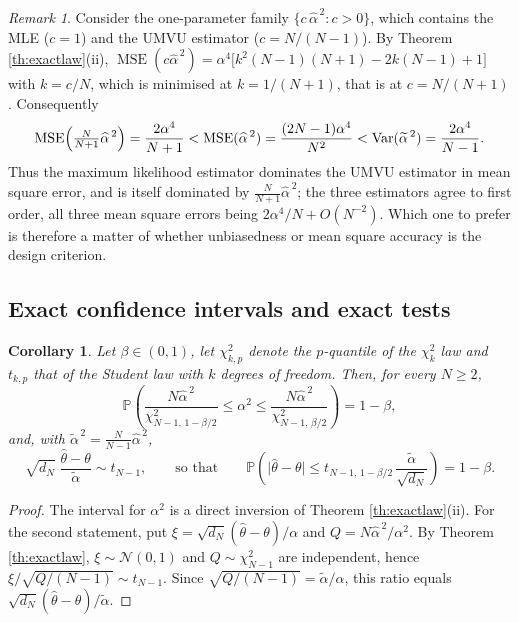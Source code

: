 \documentclass[11pt,reqno]{amsart}
\numberwithin{equation}{section}
\theoremstyle{plain}
\newtheorem{corollary}[theorem]{Corollary}
\theoremstyle{definition}
\theoremstyle{remark}
\newtheorem{remark}[theorem]{Remark}
\newcommand{\Prob}{\mathbb{P}}
\newcommand{\Norm}{\mathcal{N}}
\DeclareMathOperator{\Var}{Var}
\DeclareMathOperator{\MSE}{MSE}
\begin{document}
\begin{remark}\label{re:msecomp}
Consider the one-parameter family $\{c\,\widehat\alpha^{\,2}:c>0\}$, which contains the
MLE ($c=1$) and the UMVU estimator ($c=N/(N-1)$). By Theorem \ref{th:exactlaw}(ii),
$\MSE(c\widehat\alpha^{\,2})
=\alpha^{4}\bigl[k^{2}(N-1)(N+1)-2k(N-1)+1\bigr]$ with $k=c/N$, which is minimised at
$k=1/(N+1)$, that is at $c=N/(N+1)$. Consequently
\begin{equation}\label{eq:msecomp}
  \MSE\Bigl(\tfrac{N}{N+1}\widehat\alpha^{\,2}\Bigr)=\frac{2\alpha^{4}}{N+1}
  <\MSE(\widehat\alpha^{\,2})=\frac{(2N-1)\alpha^{4}}{N^{2}}
  <\Var(\widetilde\alpha^{\,2})=\frac{2\alpha^{4}}{N-1}.
\end{equation}
Thus the maximum likelihood estimator dominates the UMVU estimator in mean square error,
and is itself dominated by $\frac{N}{N+1}\widehat\alpha^{\,2}$; the three estimators
agree to first order, all three mean square errors being $2\alpha^{4}/N+O(N^{-2})$. Which
one to prefer is therefore a matter of whether unbiasedness or mean square accuracy is
the design criterion.
\end{remark}

\subsection{Exact confidence intervals and exact tests}

\begin{corollary}\label{co:ci}
Let $\beta\in(0,1)$, let $\chi^{2}_{k,p}$ denote the $p$-quantile of the $\chi^{2}_{k}$
law and $t_{k,p}$ that of the Student law with $k$ degrees of freedom. Then, for every
$N\ge2$,
\begin{equation}\label{eq:ci-alpha}
  \Prob\left(\frac{N\widehat\alpha^{\,2}}{\chi^{2}_{N-1,\,1-\beta/2}}\le\alpha^{2}
  \le\frac{N\widehat\alpha^{\,2}}{\chi^{2}_{N-1,\,\beta/2}}\right)=1-\beta,
\end{equation}
and, with $\widetilde\alpha^{\,2}=\frac{N}{N-1}\widehat\alpha^{\,2}$,
\begin{equation}\label{eq:ci-theta}
  \sqrt{d_N}\;\frac{\widehat\theta-\theta}{\widetilde\alpha}\sim t_{N-1},
  \qquad\text{so that}\qquad
  \Prob\left(\bigl|\widehat\theta-\theta\bigr|
  \le t_{N-1,\,1-\beta/2}\,\frac{\widetilde\alpha}{\sqrt{d_N}}\right)=1-\beta .
\end{equation}
\end{corollary}

\begin{proof}
The interval for $\alpha^{2}$ is a direct inversion of Theorem \ref{th:exactlaw}(ii). For
the second statement, put $\xi=\sqrt{d_N}(\widehat\theta-\theta)/\alpha$ and
$Q=N\widehat\alpha^{\,2}/\alpha^{2}$. By Theorem \ref{th:exactlaw}, $\xi\sim\Norm(0,1)$
and $Q\sim\chi^{2}_{N-1}$ are independent, hence
$\xi/\sqrt{Q/(N-1)}\sim t_{N-1}$. Since $\sqrt{Q/(N-1)}=\widetilde\alpha/\alpha$, this
ratio equals $\sqrt{d_N}(\widehat\theta-\theta)/\widetilde\alpha$.
\end{proof}
\end{document}
